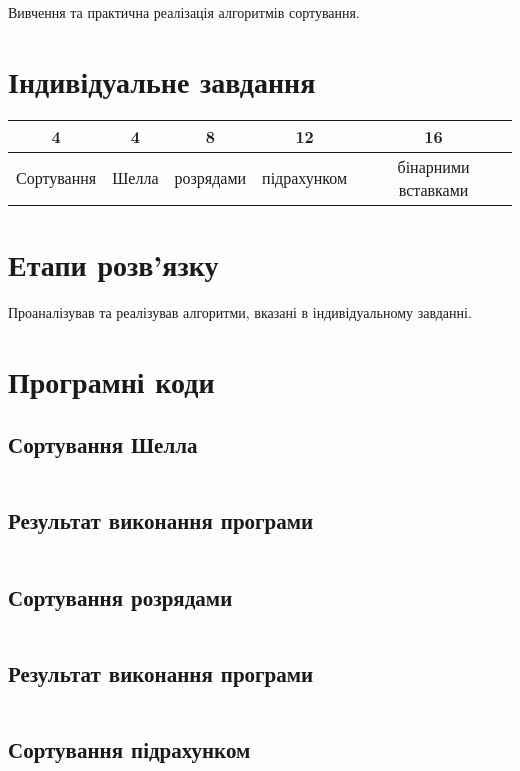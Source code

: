 \documentclass[a4paper, 12pt, oneside]{extarticle}
\begin{document}
\Margins


Вивчення та практична реалізація алгоритмів сортування.

\section*{Індивідуальне завдання}

\begin{tabular}{c|c c c c}
	4 & 4 & 8 & 12 & 16 \\
	\hline
	Сортування & Шелла & розрядами & підрахунком & бінарними вставками
\end{tabular}

\section*{Етапи розв'язку}

Проаналізував та реалізував алгоритми, вказані
в індивідуальному завданні.

\section*{Програмні коди}

\subsection*{Сортування Шелла}

\inputminted{c++}{shell_sort.cpp}
\subsection*{Результат виконання програми}
\inputminted{c++}{shell_sort_out}

\subsection*{Сортування розрядами}

\inputminted{c++}{radix_sort.cpp}
\subsection*{Результат виконання програми}
\inputminted{c++}{radix_out}

\subsection*{Сортування підрахунком}
\end{document}
